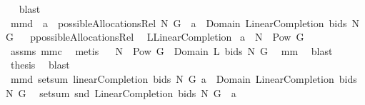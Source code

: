 \begin{isabellebody}
\isadelimproof
\ %
\endisadelimproof
%
\isatagproof
{}\isamarkupfalse%
\ blast%
\endisatagproof
{\isafoldproof}%
%
\isadelimproof
%
\endisadelimproof
\isanewline
\isanewline
{}\isamarkupfalse%
\ mm{}{}d{\isacharcolon}\ \ {\isachardoublequoteopen}a\ {\isasymin}\ possibleAllocationsRel\ N\ G{\isachardoublequoteclose}\ \ {\isachardoublequoteopen}a\ {\isasymsubseteq}\ Domain\ {\isacharparenleft}LinearCompletion\ bids\ N\ G{\isacharparenright}{\isachardoublequoteclose}\isanewline
%
\isadelimproof
%
\endisadelimproof
%
\isatagproof
{}\isamarkupfalse%
\ {\isacharminus}\isanewline
{}\isamarkupfalse%
\ {\isacharquery}p{\isacharequal}possibleAllocationsRel\ \isamarkupfalse%
\ {\isacharquery}L{\isacharequal}LinearCompletion\isanewline
{}\isamarkupfalse%
\ {\isachardoublequoteopen}a\ {\isasymsubseteq}\ N\ {\isasymtimes}\ {\isacharparenleft}Pow\ G\ {\isacharminus}\ {\isacharbraceleft}{\isacharbraceleft}{\isacharbraceright}{\isacharbraceright}{\isacharparenright}{\isachardoublequoteclose}\ \isamarkupfalse%
\ assms\ mm{}{}c\ \isamarkupfalse%
\ metis\isanewline
{}\isamarkupfalse%
\ \isamarkupfalse%
\ {\isachardoublequoteopen}N\ {\isasymtimes}\ {\isacharparenleft}Pow\ G\ {\isacharminus}\ {\isacharbraceleft}{\isacharbraceleft}{\isacharbraceright}{\isacharbraceright}{\isacharparenright}{\isacharequal}Domain\ {\isacharparenleft}{\isacharquery}L\ bids\ N\ G{\isacharparenright}{\isachardoublequoteclose}\ \isamarkupfalse%
\ mm{}{}\ \isamarkupfalse%
\ blast\isanewline
{}\isamarkupfalse%
\ \isamarkupfalse%
\ {\isacharquery}thesis\ \isamarkupfalse%
\ blast\isanewline
{}\isamarkupfalse%
%
\endisatagproof
{\isafoldproof}%
%
\isadelimproof
\isanewline
%
\endisadelimproof
\isanewline
{}\isamarkupfalse%
\ mm{}{}d{\isacharcolon}\ {\isachardoublequoteopen}setsum\ {\isacharparenleft}linearCompletion{\isacharprime}\ bids\ N\ G{\isacharparenright}\ {\isacharparenleft}a\ {\isasyminter}\ {\isacharparenleft}Domain\ {\isacharparenleft}LinearCompletion\ bids\ N\ G{\isacharparenright}{\isacharparenright}{\isacharparenright}\ {\isacharequal}\ \isanewline
setsum\ snd\ {\isacharparenleft}{\isacharparenleft}LinearCompletion\ bids\ N\ G{\isacharparenright}\ {\isacharbar}{\isacharbar}\ a{\isacharparenright}{\isachardoublequoteclose}%

\end{isabellebody}
